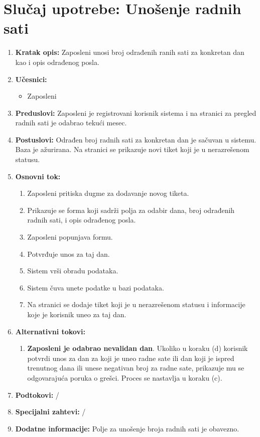 \documentclass[a4paper]{article}
\begin{document}
\section{Slučaj upotrebe: Unošenje radnih sati}
\begin{enumerate}
    \item \textbf{Kratak opis:} Zaposleni unosi broj odrađenih ranih sati za konkretan dan kao i opis odrađenog posla.
    \item \textbf{Učesnici:}
        \begin{itemize}
            \item Zaposleni
        \end{itemize}
    \item \textbf{Preduslovi:} Zaposleni je registrovani korisnik sistema i na stranici za pregled radnih sati je odabrao tekući mesec.
    \item \textbf{Postuslovi:} Odrađen broj radnih sati za konkretan dan je sačuvan u sistemu. Baza je ažurirana. Na stranici se prikazuje novi tiket koji je u nerazrešenom statusu.
    \item \textbf{Osnovni tok:}
        \begin{enumerate}
            \item Zaposleni pritiska dugme za dodavanje novog tiketa.
            \item Prikazuje se forma koji sadrži polja za odabir dana, broj odrađenih radnih sati, i opis odrađenog posla.
            \item Zaposleni popunjava formu.
            \item Potvrđuje unos za taj dan.
            \item Sistem vrši obradu podataka.
            \item Sistem čuva unete podatke u bazi podataka.
            \item Na stranici se dodaje tiket koji je u nerazrešenom statusu i informacije koje je korisnik uneo za taj dan.
        \end{enumerate}
    \item \textbf{Alternativni tokovi:}
        \begin{enumerate}
            \item \textbf{Zaposleni je odabrao nevalidan dan}. Ukoliko u koraku (d) korisnik potvrdi unos za dan za koji je uneo radne sate ili dan koji je ispred trenutnog dana ili unese negativan broj za radne sate, prikazuje mu se odgovarajuća poruka o grešci. Proces se nastavlja u koraku (c).
        \end{enumerate}
    \item \textbf{Podtokovi:} /
    \item \textbf{Specijalni zahtevi:} /
    \item \textbf{Dodatne informacije:} Polje za unošenje broja radnih sati je obavezno.
\end{enumerate}
\end{document}
